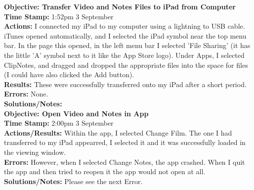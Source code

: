 \documentclass{article}
\begin{document}
\textbf{Objective: Transfer Video and Notes Files to iPad from Computer}\\
\textbf{Time Stamp:} 1:52pm 3 September\\
\textbf{Actions:} I connected my iPad to my computer using a lightning to USB cable. iTunes opened automatically, and I selected the iPad symbol near the top menu bar. In the page this opened, in the left menu bar I selected 'File Sharing' (it has the little 'A' symbol next to it like the App Store logo). Under Apps, I selected ClipNotes, and dragged and dropped the appropriate files into the space for files (I could have also clicked the Add button).\\
\textbf{Results:} These were successfully transferred onto my iPad after a short period.\\
\textbf{Errors:} None. \\
\textbf{Solutions/Notes:}\\

\textbf{Objective: Open Video and Notes in App}\\
\textbf{Time Stamp:} 2:00pm 3 September\\
\textbf{Actions/Results:} Within the app, I selected Change Film. The one I had transferred to my iPad appearred, I selected it and it was successfully loaded in the viewing window.\\
\textbf{Errors:} However, when I selected Change Notes, the app crashed. When I quit the app and then tried to reopen it the app would not open at all.\\
\textbf{Solutions/Notes:} Please see the next Error.\\
\end{document}
